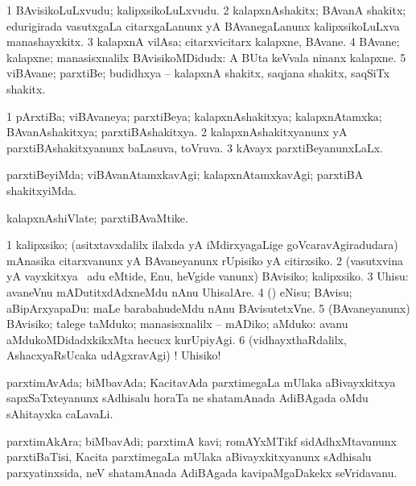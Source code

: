 \bentry
{}
\gl{\nA}
\bmng
\bnum
\num{1} BAvisikoLuLxvudu; kalipxsikoLuLxvudu. 
\num{2} kalapxnAshakitx; BAvanA shakitx; edurigirada vasutxgaLa citarxgaLanunx yA BAvanegaLanunx kalipxsikoLuLxva manashayxkitx. 
\num{3} kalapxnA vilAsa; citarxvicitarx kalapxne, BAvane. 
\num{4} BAvane; kalapxne; manasisxnalilx BAvisikoMDidudx:  A BUta keVvala ninanx kalapxne. 
\num{5} viBAvane; parxtiBe; budidhxya -- kalapxnA shakitx, saqjana shakitx, saqSiTx shakitx. 
\enum
\emng
\eentry

\bentry
{}
\gl{\gu}
\bmng
\bnum
\num{1} pArxtiBa; viBAvaneya; parxtiBeya; kalapxnAshakitxya; kalapxnAtamxka; BAvanAshakitxya; parxtiBAshakitxya. 
\num{2} kalapxnAshakitxyanunx yA parxtiBAshakitxyanunx baLasuva, toVruva. 
\num{3} kAvayx parxtiBeyanunxLaLx. 
\enum
\emng
\eentry

\bentry
{}
\gl{\kirxvi}
\bmng
parxtiBeyiMda; viBAvanAtamxkavAgi; kalapxnAtamxkavAgi; parxtiBA shakitxyiMda. 
\emng
\eentry

\bentry
{}
\gl{\nA}
\bmng
kalapxnAshiVlate; parxtiBAvaMtike. 
\emng
\eentry

\bentry
{}
\gl{\sakirx}
\bmng
\bnum
\num{1} kalipxsiko; (asitxtavxdalilx ilalxda yA iMdirxyagaLige goVcaravAgiradudara) mAnasika citarxvanunx yA BAvaneyanunx rUpisiko yA citirxsiko. 
\num{2} (vasutxvina yA vayxkitxya \vi\ adu eMtide, Enu, heVgide \mo vanunx) BAvisiko; kalipxsiko. 
\num{3} Uhisu:  avaneVnu mADutitxdAdxneMdu nAnu UhisalAre. 
\num{4} (\AmA) eNisu; BAvisu; aBipArxyapaDu:  maLe barabahudeMdu nAnu BAvisutetxVne. 
\num{5} (BAvaneyanunx) BAvisiko; talege taMduko; manasisxnalilx -- mADiko; aMduko:  avanu aMdukoMDidadxkikxMta hecucx kurUpiyAgi. 
\num{6} (vidhayxthaRdalilx, AshacxyaRsUcaka udAgxravAgi) ! Uhisiko! 
\enum
\emng
\eentry

\bentry
{}
\gl{\nA}
\bmng
parxtimAvAda; biMbavAda; KacitavAda parxtimegaLa mUlaka aBivayxkitxya sapxSaTxteyanunx sAdhisalu horaTa ne shatamAnada AdiBAgada oMdu sAhitayxka caLavaLi. 
\emng
\eentry

\bentry
{}
\gl{\nA}
\bmng
parxtimAkAra; biMbavAdi; parxtimA kavi; romAYxMTikf sidAdhxMtavanunx parxtiBaTisi, Kacita parxtimegaLa mUlaka aBivayxkitxyanunx sAdhisalu parxyatinxsida, neV shatamAnada AdiBAgada kavipaMgaDakekx seVridavanu. 
\emng
\eentry

